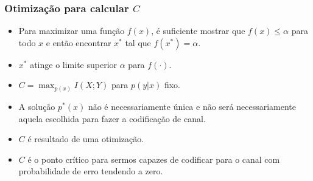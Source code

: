 \begin{frame}[allowframebreaks]
  \frametitle{Otimização para calcular $C$}
  \begin{itemize}
  \item Para maximizar uma função $f(x)$, é suficiente mostrar que $f(x) \leq \alpha$ para todo $x$ e 
	então encontrar $x^\ast$ tal que $f(x^\ast)=\alpha$.
  \item $x^\ast$ atinge o limite superior $\alpha$ para $f(\cdot)$.
  \item $C = \max_{p(x)} I(X;Y)$ para $p(y|x)$ fixo.
  \item A solução $p^\ast (x)$ não é necessariamente única e não será necessariamente aquela escolhida para fazer a codificação de canal.
  \item $C$ é resultado de uma otimização.
  \item $C$ é o ponto crítico para sermos capazes de codificar para o canal com probabilidade de erro tendendo a zero.
  \end{itemize}
\end{frame}


